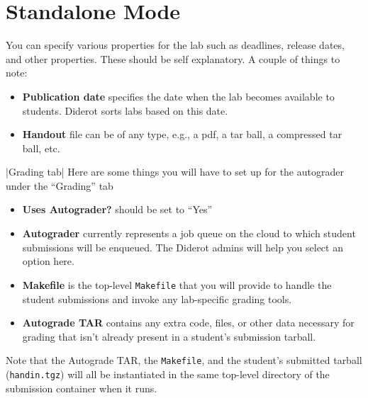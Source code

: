 \section{Standalone Mode}
\label{sec:codelabs::standalone}

\begin{gram}
You can specify various properties for the lab such as deadlines, release dates, and other properties.  These should be self explanatory.  A couple of things to note:
\begin{itemize}
\item \textbf{Publication date} specifies the date when the lab becomes available to students.  Diderot sorts labs based on this date.
\item \textbf{Handout} file can be of any type, e.g., a pdf, a tar ball, a compressed tar ball, etc.
\end{itemize}
\end{gram}

\begin{gram}|Grading tab|
Here are some things you will have to set up for the autograder under the ``Grading'' tab
    \begin{itemize}
        \item \textbf{Uses Autograder?} should be set to ``Yes''
        \item \textbf{Autograder} currently represents a job queue on the cloud to which student submissions will be enqueued. 
            The Diderot admins will help you select an option here. 
        \item \textbf{Makefile} is the top-level \verb|Makefile| that you will provide to handle the student submissions and invoke
            any lab-specific grading tools. 
        \item \textbf{Autograde TAR} contains any extra code, files, or other data necessary for grading that isn't already present
            in a student's submission tarball. 
    \end{itemize}
Note that the Autograde TAR, the \verb|Makefile|, and the student's submitted tarball (\verb|handin.tgz|) will
all be instantiated in the same top-level directory of the submission container when it runs. 
\end{gram}

